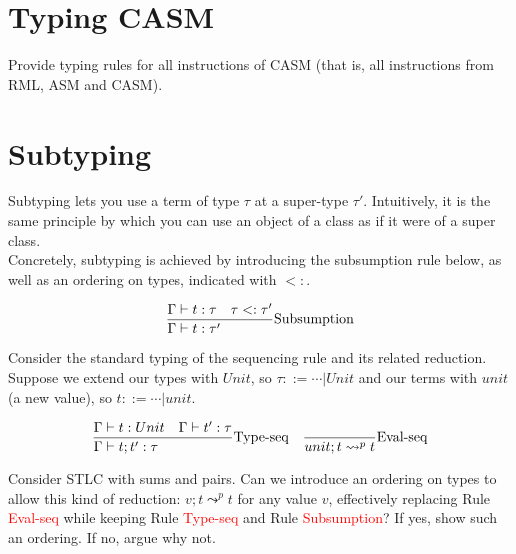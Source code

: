 \documentclass{article}
\begin{document}
\newpage
\section{Typing CASM}
Provide typing rules for all instructions of CASM (that is, all instructions from RML, ASM and CASM).

\newpage
\section{Subtyping}
Subtyping lets you use a term of type $\tau$ at a super-type $\tau'$. Intuitively, it is the same principle by which you can use an object of a class as if it were of a super class. \\
Concretely, subtyping is achieved by introducing the subsumption rule below, as well as an ordering on types, indicated with $<:$.

\begin{gather*}
    \st[Subsumption]{
        \Gamma\vdash t:\tau'
    }{
        \Gamma\vdash t:\tau \quad
        \tau <:\tau'
    }
\end{gather*}

Consider the standard typing of the sequencing rule and its related reduction. Suppose we extend our types with $Unit$, so $\tau ::= \cdots | Unit$ and our terms with $unit$ (a new value), so $t ::= \cdots | unit$.

$$
\begin{array}{lr}
    \st[Type-seq]{
        \Gamma\vdash t;t':\tau
    }{
        \Gamma \vdash t: Unit \quad
        \Gamma \vdash t':\tau
    }
    &
    \st[Eval-seq]{
        unit;t\leadsto^p t
    }{}
\end{array}
$$

Consider STLC with sums and pairs. Can we introduce an ordering on types to allow this kind of reduction: $v;t \leadsto^p t$ for any value $v$, effectively replacing Rule \textcolor{red}{Eval-seq} while keeping Rule \textcolor{red}{Type-seq} and Rule \textcolor{red}{Subsumption}? If yes, show such an ordering. If no, argue why not.
\end{document}
